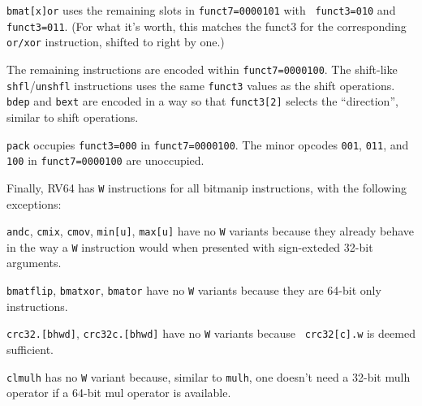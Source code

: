 {\tt bmat[x]or} uses the remaining slots in {\tt funct7=0000101} with {\tt
funct3=010} and {\tt funct3=011}. (For what it's worth, this matches the funct3
for the corresponding {\tt or/xor} instruction, shifted to right by one.)

The remaining instructions are encoded within {\tt funct7=0000100}. The
shift-like {\tt shfl}/{\tt unshfl} instructions uses the same {\tt funct3}
values as the shift operations. {\tt bdep} and {\tt bext} are encoded in a
way so that {\tt funct3[2]} selects the ``direction'', similar to shift
operations.

{\tt pack} occupies {\tt funct3=000} in {\tt funct7=0000100}. The minor
opcodes {\tt 001}, {\tt 011}, and {\tt 100} in {\tt funct7=0000100}
are unoccupied.

Finally, RV64 has {\tt *W} instructions for all bitmanip instructions, with the
following exceptions:

{\tt andc}, {\tt cmix}, {\tt cmov}, {\tt min[u]}, {\tt max[u]} have no {\tt *W}
variants because they already behave in the way a {\tt *W} instruction would
when presented with sign-exteded 32-bit arguments.

{\tt bmatflip}, {\tt bmatxor}, {\tt bmator} have no {\tt *W} variants because
they are 64-bit only instructions.

{\tt crc32.[bhwd]}, {\tt crc32c.[bhwd]} have no {\tt *W} variants because {\tt
crc32[c].w} is deemed sufficient.

{\tt clmulh} has no {\tt *W} variant because, similar to {\tt mulh}, one
doesn't need a 32-bit mulh operator if a 64-bit mul operator is available.


